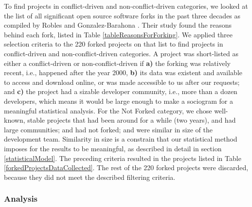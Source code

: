 \documentclass[12pt,letterpaper]{gthesis2}  %
\begin{document}

To find projects in conflict-driven and non-conflict-driven categories, we looked at the list of all significant open source software forks in the past three decades as compiled by Robles and Gonzalez-Barahona \cite{Robles}. Their study found the reasons behind each fork, listed in Table \ref{tableReasonsForForking}. We applied three selection criteria to the 220 forked projects on that list to find projects in conflict-driven and non-conflict-driven categories. A project was short-listed as either a conflict-driven or non-conflict-driven if \textbf{a)} the forking was relatively recent, i.e., happened after the year 2000, \textbf{b)} its data was existent and available to access and download online, or was made accessible to us after our requests; and \textbf{c)} the project had a sizable developer community, i.e., more than a dozen developers, which means it would be large enough to make a sociogram for a meaningful statistical analysis. For the Not Forked category, we chose well-known, stable projects that had been around for a while (two years), and had large communities; and had not forked; and were similar in size of the development team. Similarity in size is a constrain that our statistical method imposes for the results to be meaningful, as described in detail in section \ref{statisticalModel}.  The preceding criteria resulted in the projects listed in Table \ref{forkedProjectsDataCollected}. The rest of the 220 forked projects were discarded, because they did not meet the described filtering criteria.


\subsubsection{Analysis}
\end{document}
